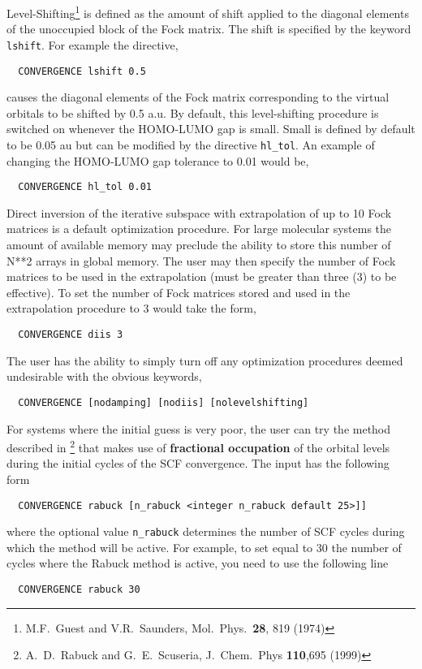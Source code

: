 Level-Shifting\footnote {M.F.~Guest and 
V.R.~Saunders, Mol.~Phys.~{\bf 28}, 819 (1974)} is defined as the
amount of shift applied to the diagonal elements of the unoccupied
block of the Fock matrix.  The shift is specified by the
keyword \verb+lshift+.  For example the directive,
\begin{verbatim}
  CONVERGENCE lshift 0.5
\end{verbatim}
causes the diagonal elements of the Fock matrix
corresponding to the virtual orbitals to be shifted by 0.5 a.u.
By default, this level-shifting procedure is switched on whenever the
HOMO-LUMO gap is small.  Small is defined by default to be 0.05 au but
can be modified by the directive \verb+hl_tol+.  An example of
changing the HOMO-LUMO gap tolerance to 0.01 would be,
\begin{verbatim}
  CONVERGENCE hl_tol 0.01
\end{verbatim}

Direct inversion of the iterative subspace with extrapolation of up to
10 Fock matrices is a default optimization procedure.  For large
molecular systems the amount of available memory may preclude the ability to
store this number of N**2 arrays in global memory.  The user may then
specify the number of Fock matrices to be used in the extrapolation
(must be greater than three (3) to be effective).  To set the number of
Fock matrices stored and used in the extrapolation procedure to 3
would take the form,
\begin{verbatim}
  CONVERGENCE diis 3
\end{verbatim}

The user has the ability to simply turn off any optimization
procedures deemed undesirable with the obvious keywords,
\begin{verbatim}
  CONVERGENCE [nodamping] [nodiis] [nolevelshifting]
\end{verbatim}


For systems where the initial guess is very poor, the user can try the
method described in
\footnote{A.~D.~Rabuck and G.~E.~Scuseria, J.~Chem.~Phys {\bf 110},695
(1999)}
that makes use of {\bf fractional occupation} of the orbital levels during
the initial cycles of the SCF convergence. The input has the following form

\begin{verbatim}
  CONVERGENCE rabuck [n_rabuck <integer n_rabuck default 25>]]
\end{verbatim}

where the optional value {\tt n\_rabuck} determines the number of SCF
cycles during which the method will be active. For example, to
set equal to 30 the number of cycles where the Rabuck method is
active, you need to use the following line
\begin{verbatim}
  CONVERGENCE rabuck 30
\end{verbatim}



